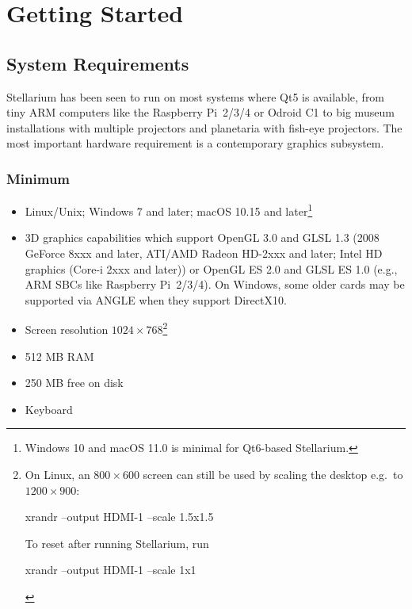 

\chapter{Getting Started}
\label{ch:GettingStarted}

\section{System Requirements}
\label{sec:GettingStarted:SystemRequirements}

Stellarium has been seen to run on most systems where Qt5 is
available, from tiny ARM computers like the Raspberry Pi~2/3/4
or Odroid C1 to big museum installations with multiple projectors 
and planetaria with fish-eye projectors. 
The most important hardware requirement is a contemporary graphics subsystem.


\subsection{Minimum}
\begin{itemize}
\item Linux/Unix; Windows 7 and later; macOS 10.15 and later\footnote{Windows 10 and macOS 11.0 is minimal for Qt6-based Stellarium.}
\item 3D graphics capabilities which support OpenGL 3.0 and GLSL 1.3 (2008
  GeForce 8xxx and later, ATI/AMD Radeon HD-2xxx and later; Intel HD
  graphics (Core-i 2xxx and later)) or OpenGL ES 2.0 and GLSL ES 1.0
  (e.g., ARM SBCs like Raspberry Pi~2/3/4). On Windows, some older cards
  may be supported via ANGLE when they support DirectX10.
\item Screen resolution $1024\times768$\footnote{On Linux, an $800\times600$ screen can still be used by scaling the desktop e.g.\ to $1200\times900$:
  \begin{commands}
    xrandr --output HDMI-1 --scale 1.5x1.5
  \end{commands}
  To reset after running Stellarium, run
  \begin{commands}
    xrandr --output HDMI-1 --scale 1x1
  \end{commands}}
\item 512 MB RAM
\item 250 MB free on disk
\item Keyboard
\end{itemize}

